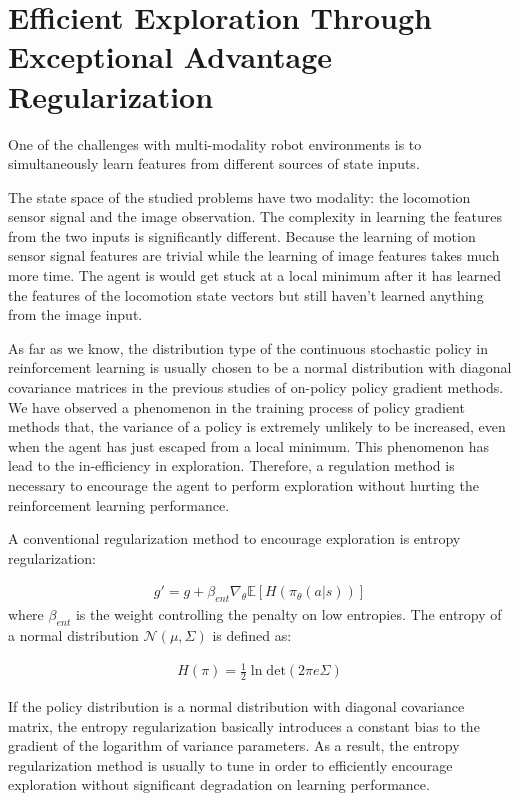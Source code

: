 \section{Efficient Exploration Through Exceptional Advantage Regularization}\label{sec_method_expadv_reg}
One of the challenges with multi-modality robot environments is to simultaneously learn features from different sources of state inputs.

The state space of the studied problems have two modality: the locomotion sensor signal and the image observation. The complexity in learning the features from the two inputs is significantly different. Because the learning of motion sensor signal features are trivial while the learning of image features takes much more time. The agent is would get stuck at a local minimum after it has learned the features of the locomotion state vectors but still haven't learned anything from the image input.

As far as we know, the distribution type of the continuous stochastic policy in reinforcement learning is usually chosen to be a normal distribution with diagonal covariance matrices in the previous studies of on-policy policy gradient methods. We have observed a phenomenon in the training process of policy gradient methods that, the variance of a policy is extremely unlikely to be increased, even when the agent has just escaped from a local minimum. This phenomenon has lead to the in-efficiency in exploration. Therefore, a regulation method is necessary to encourage the agent to perform exploration without hurting the reinforcement learning performance.

A conventional regularization method to encourage exploration is entropy regularization:

\begin{align}
g' = g +\beta_{ent}\nabla_\theta \mathbb{E}[ H(\pi_\theta(a|s)) ]
\end{align}
where $\beta_{ent}$ is the weight controlling the penalty on low entropies.
The entropy of a normal distribution $\mathcal{N}(\mu,\Sigma)$ is defined as:

\begin{align}
	H(\pi) =  \frac{1}{2} \ln \mathrm{det}(2\pi e \Sigma)
\end{align}

If the policy distribution is a normal distribution with diagonal covariance matrix, the entropy regularization basically introduces a constant bias to the gradient of the logarithm of variance parameters. As a result, the entropy regularization method is usually to tune in order to efficiently encourage exploration without significant degradation on learning performance.

